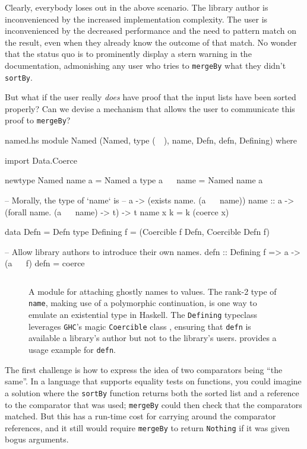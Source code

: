 \documentclass[format=sigplan, review=false, screen=true]{acmart}
\makeatletter
\let\origsubsection\subsection
\renewcommand\subsection{\@ifstar{\starsubsection}{\nostarsubsection}}
\newcommand\nostarsubsection[1]
{\subsectionprelude\origsubsection{#1}\subsectionpostlude}
\newcommand\starsubsection[1]
{\subsectionprelude\origsubsection*{#1}\subsectionpostlude}
\newcommand\subsectionprelude{%
  \vspace{-0.25em}
}
\newcommand\subsectionpostlude{%
  \vspace{-0.05em}
}
\makeatother
\begin{document}
Clearly, everybody loses out in the above scenario. The
library author is inconvenienced by the increased implementation complexity.
The user is inconvenienced by the decreased performance and the need to
pattern match on the result, even when they  already know the
outcome of that match. No wonder that the status quo is to prominently display
a stern warning in the documentation, admonishing
any user who tries to \texttt{mergeBy} what they didn't \texttt{sortBy}.

But what if the user really \emph{does} have proof that the input lists have
been sorted properly? Can we devise a mechanism that allows the user to communicate
this proof to \texttt{mergeBy}?

\subsection{Conjuring a name}

\begin{filecontents*}{named.hs}
module Named
  (Named, type (~~), name, Defn, defn, Defining) where

import Data.Coerce

newtype Named name a = Named a
type a ~~ name = Named name a

-- Morally, the type of `name` is
--      a -> (exists name. (a ~~ name))
name :: a -> (forall name. (a ~~ name) -> t) -> t
name x k = k (coerce x)

data Defn = Defn
type Defining f = (Coercible f Defn, Coercible Defn f)

-- Allow library authors to introduce their own names.
defn :: Defining f => a -> (a ~~ f)
defn = coerce
\end{filecontents*}
\begin{figure}[b]
  \inputminted{haskell}{named.hs}
  \caption{A module for attaching ghostly names to values. The rank-2 type of \texttt{name},
    making use of a polymorphic continuation, is one way to emulate an existential type in
    Haskell. The \texttt{Defining} typeclass
    leverages \texttt{GHC}'s magic \texttt{Coercible} class \cite{Breitner:2014:SZC:2692915.2628141},
    ensuring that \texttt{defn} is available a library's author but not
    to the library's users.  provides a usage example for \texttt{defn}.\label{name-module}}
\end{figure}


The first challenge is how to express the idea of two  comparators
being ``the same''. In a language that supports equality tests on functions,
you could imagine a solution where the \texttt{sortBy} function returns both the sorted
list and a reference to the comparator that was used; \texttt{mergeBy} could
then check that the comparators matched. But this has a run-time cost for carrying
around the comparator references, and it still would require \texttt{mergeBy} to
return \texttt{Nothing} if it was given bogus arguments.
\end{document}
